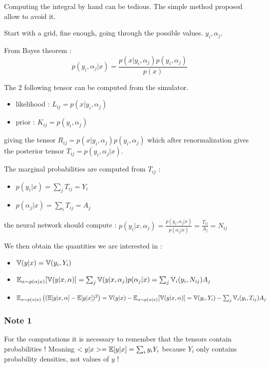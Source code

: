 
Computing the integral by hand can be tedious.
The simple method proposed allow to avoid it.

Start with a grid, fine enough, going through the possible values. $y_i, \alpha_j$.

From Bayes theorem : 
$$
    p(y_i, \alpha_j | x) = \frac{p(x|y_i, \alpha_j) p(y_i, \alpha_j)}{p(x)}
$$

The 2 following tensor can be computed from the simulator.
\begin{itemize}
  \item likelihood : $L_{ij} = p(x|y_i, \alpha_j)$
  \item prior : $K_{ij} = p(y_i, \alpha_j)$ 
\end{itemize}

giving the tensor $ R_{ij} = p(x|y_i, \alpha_j) p(y_i, \alpha_j) $ 
which after renormalization gives the posterior tensor $ T_{ij} = p(y_i, \alpha_j | x)$.

The marginal probabilities are computed from $T_{ij}$ :
\begin{itemize}
  \item $p(y_i | x) = \sum_j T_{ij} = Y_i$
  \item $p(\alpha_j | x) = \sum_i T_{ij} = A_j$
\end{itemize}

the neural network should compute : $p(y_i | x, \alpha_j) = \frac{p(y_i, \alpha_j | x)}{p(\alpha_j | x)} = \frac{T_{ij}}{A_j} = N_{ij}$

We then obtain the quantities we are interested in :
\begin{itemize}
  \item $ \mathbb{V}(y|x) = \mathbb{V}(y_i, Y_i) $
  \item $ \mathbb{E}_{\alpha \sim p(\alpha|x)}[ \mathbb{V}(y|x, \alpha) ] = \sum_j \mathbb{V}(y|x, \alpha_j) p(\alpha_j | x) = \sum_j \mathbb{V}_i(y_i, N_{ij}) A_j$
  \item $\mathbb{E}_{\alpha \sim p(\alpha|x)} \left ((\mathbb{E} [y|x, \alpha]  - \mathbb{E}[y|x])^2\right ) = \mathbb{V}(y|x) - \mathbb{E}_{\alpha \sim p(\alpha|x)}[ \mathbb{V}(y|x, \alpha) ] = \mathbb{V}(y_i, Y_i) - \sum_j \mathbb{V}_i(y_i, T_{ij}) A_j$
\end{itemize}


\subsubsection{Note 1}

For the computations it is necessary to remember that the tensors contain probabilities !
Meaning $<y|x>= \mathbb{E}[y|x] = \sum_i y_i Y_i$ because $Y_i$ only contains probability densities, not values of $y$ !

